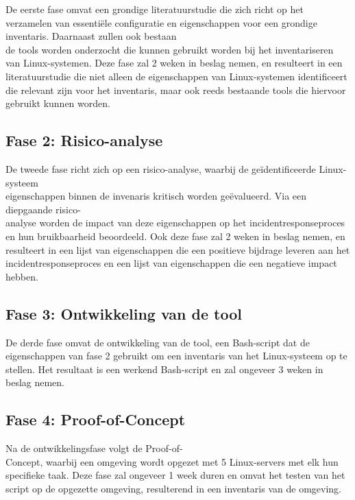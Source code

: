 De eerste fase omvat een grondige literatuurstudie die zich richt op het verzamelen van essenti\"ele configuratie en eigenschappen voor een grondige inventaris.
Daarnaast zullen ook bestaan\\de tools worden onderzocht die kunnen gebruikt worden bij het inventariseren van Linux-systemen.
Deze fase zal 2 weken in beslag nemen, en resulteert in een literatuurstudie die niet alleen de  eigenschappen van Linux-systemen identificeert die relevant zijn voor het inventaris, maar ook reeds bestaande tools die hiervoor gebruikt kunnen worden.

\subsection{Fase 2: Risico-analyse}%
\label{sub:risico_analyse}

De tweede fase richt zich op een risico-analyse, waarbij de ge\"identificeerde Linux-systeem\\eigenschappen binnen de invenaris kritisch worden ge\"evalueerd.
Via een diepgaande risico-\\analyse worden de impact van deze eigenschappen op het incidentresponseproces en hun bruikbaarheid beoordeeld.
Ook deze fase zal 2 weken in beslag nemen, en resulteert in een lijst van eigenschappen die een positieve bijdrage leveren aan het incidentresponseproces en een lijst van eigenschappen die een negatieve impact hebben.

\subsection{Fase 3: Ontwikkeling van de tool}%
\label{sub:ontwikkeling_van_de_tool}

De derde fase omvat de ontwikkeling van de tool, een Bash-script dat de eigenschappen van fase 2 gebruikt om een inventaris van het Linux-systeem op te stellen.
Het resultaat is een werkend Bash-script en zal ongeveer 3 weken in beslag nemen.

\subsection{Fase 4: Proof-of-Concept}%
\label{sub:proof_of_concept}

Na de ontwikkelingsfase volgt de Proof-of-\\Concept, waarbij een omgeving wordt opgezet met 5 Linux-servers met elk hun specifieke taak.
Deze fase zal ongeveer 1 week duren en omvat het testen van het script op de opgezette omgeving, resulterend in een inventaris van de omgeving.

